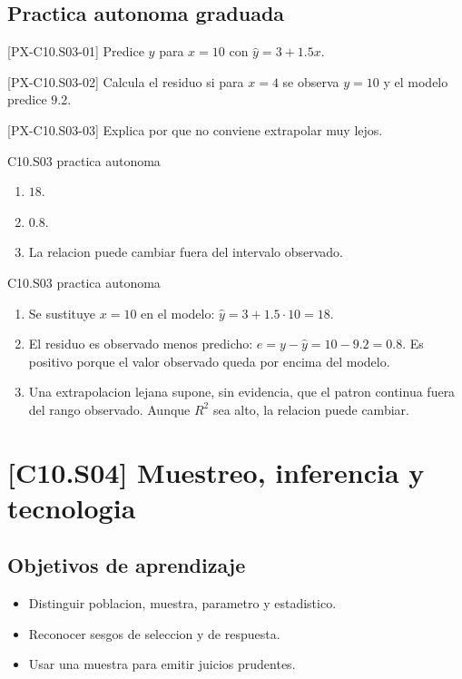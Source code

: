 \subsection*{Practica autonoma graduada}
\begin{exercise}{[PX-C10.S03-01] Predice \(y\) para \(x=10\) con \(\hat y=3+1.5x\).}\end{exercise}
\begin{exercise}{[PX-C10.S03-02] Calcula el residuo si para \(x=4\) se observa \(y=10\) y el modelo predice \(9.2\).}\end{exercise}
\begin{exercise}{[PX-C10.S03-03] Explica por que no conviene extrapolar muy lejos.}\end{exercise}
\begin{shortanswer}{C10.S03 practica autonoma}
\begin{enumerate}
  \item \(18\).
  \item \(0.8\).
  \item La relacion puede cambiar fuera del intervalo observado.
\end{enumerate}
\end{shortanswer}
\begin{fullsolution}{C10.S03 practica autonoma}
\begin{enumerate}
  \item Se sustituye \(x=10\) en el modelo: \(\hat y=3+1.5\cdot10=18\).
  \item El residuo es observado menos predicho: \(e=y-\hat y=10-9.2=0.8\). Es positivo porque
  el valor observado queda por encima del modelo.
  \item Una extrapolacion lejana supone, sin evidencia, que el patron continua fuera del rango
  observado. Aunque \(R^2\) sea alto, la relacion puede cambiar.
\end{enumerate}
\end{fullsolution}

\section{[C10.S04] Muestreo, inferencia y tecnologia}

\subsection*{Objetivos de aprendizaje}
\begin{itemize}
  \item Distinguir poblacion, muestra, parametro y estadistico.
  \item Reconocer sesgos de seleccion y de respuesta.
  \item Usar una muestra para emitir juicios prudentes.
\end{itemize}

